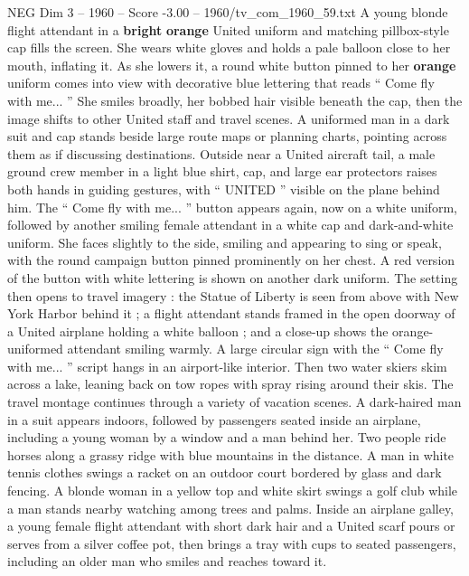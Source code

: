 \begin{textsample}{NEG Dim 3 – 1960 – Score -3.00 – 1960/tv\_com\_1960\_59.txt}  \label{ex:f3_neg_071}
A young blonde flight attendant in a \textbf{bright} \textbf{orange} United uniform and matching pillbox-style cap fills the screen.
She wears white gloves and holds a pale balloon close to her mouth, inflating it.
As she lowers it, a round white button pinned to her \textbf{orange} uniform comes into view with decorative blue lettering that reads “ Come fly with me... ” She smiles broadly, her bobbed hair visible beneath the cap, then the image shifts to other United staff and travel scenes.
A uniformed man in a dark suit and cap stands beside large route maps or planning charts, pointing across them as if discussing destinations.
Outside near a United aircraft tail, a male ground crew member in a light blue shirt, cap, and large ear protectors raises both hands in guiding gestures, with “ UNITED ” visible on the plane behind him.
The “ Come fly with me... ” button appears again, now on a white uniform, followed by another smiling female attendant in a white cap and dark-and-white uniform.
She faces slightly to the side, smiling and appearing to sing or speak, with the round campaign button pinned prominently on her chest.
A red version of the button with white lettering is shown on another dark uniform.
The setting then opens to travel imagery : the Statue of Liberty is seen from above with New York Harbor behind it ; a flight attendant stands framed in the open doorway of a United airplane holding a white balloon ; and a close-up shows the orange-uniformed attendant smiling warmly.
A large circular sign with the “ Come fly with me... ” script hangs in an airport-like interior.
Then two water skiers skim across a lake, leaning back on tow ropes with spray rising around their skis.
The travel montage continues through a variety of vacation scenes.
A dark-haired man in a suit appears indoors, followed by passengers seated inside an airplane, including a young woman by a window and a man behind her.
Two people ride horses along a grassy ridge with blue mountains in the distance.
A man in white tennis clothes swings a racket on an outdoor court bordered by glass and dark fencing.
A blonde woman in a yellow top and white skirt swings a golf club while a man stands nearby watching among trees and palms.
Inside an airplane galley, a young female flight attendant with short dark hair and a United scarf pours or serves from a silver coffee pot, then brings a tray with cups to seated passengers, including an older man who smiles and reaches toward it.

\end{textsample}
